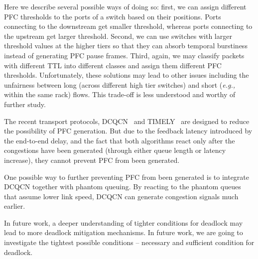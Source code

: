 Here we describe several possible ways of doing so: first, we can assign different PFC thresholds to 
the ports of a switch based on their positions. Ports connecting to the downstream get smaller threshold, 
whereas ports connecting to the upstream get larger threshold. 
Second, we can use switches with larger threshold values at the higher tiers so that they can absorb 
temporal burstiness instead of generating PFC pause frames. Third, again, we may classify 
packets with different TTL into different classes and assign them different PFC thresholds.
Unfortunately, these solutions may lead to other issues including the unfairness between long (across 
different high tier switches) and short ({\em e.g.,} within the same rack) flows. 
This trade-off is less understood and worthy of further study.




The recent transport protocols, DCQCN~\cite{dcqcn} and TIMELY~\cite{timely} are designed to reduce 
the possibility of PFC generation. But due to the feedback 
latency introduced by the end-to-end delay, and the fact that both algorithms react only after the 
congestions have been generated (through either queue length or latency increase), they cannot prevent PFC 
from been generated. 

One possible way to further preventing PFC from been generated is to integrate DCQCN together with 
phantom queuing. By reacting to the phantom queues that assume lower link speed, DCQCN can generate 
congestion signals much earlier. 

 In future work, a deeper understanding of tighter conditions 
for deadlock may lead to more deadlock mitigation mechanisms. In future work, we are going to 
investigate the tightest possible conditions -- necessary and sufficient condition for deadlock. 